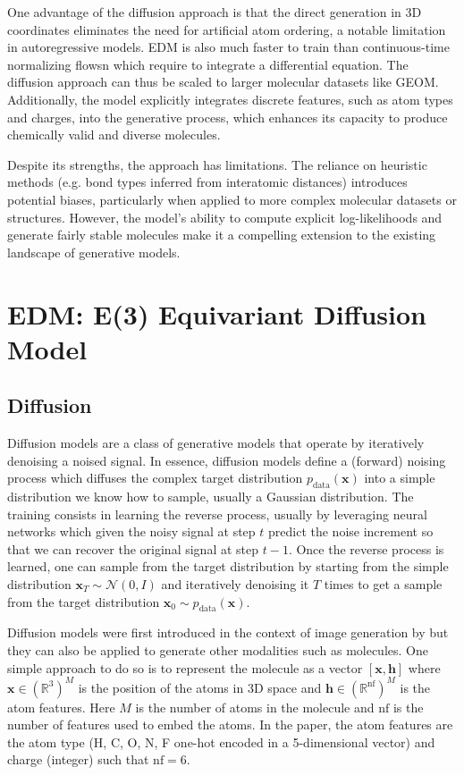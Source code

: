\documentclass[sigconf]{acmart}
\begin{document}
One advantage of the diffusion approach is that the direct generation in 3D coordinates eliminates the need for artificial atom ordering, a notable limitation in autoregressive models. EDM is also much faster to train than continuous-time normalizing flowsn which require to integrate a differential equation. The diffusion approach can thus be scaled to larger molecular datasets like GEOM. Additionally, the model explicitly integrates discrete features, such as atom types and charges, into the generative process, which enhances its capacity to produce chemically valid and diverse molecules.

Despite its strengths, the approach has limitations. The reliance on heuristic methods (e.g. bond types inferred from interatomic distances) introduces potential biases, particularly when applied to more complex molecular datasets or structures. However, the model's ability to compute explicit log-likelihoods and generate fairly stable molecules make it a compelling extension to the existing landscape of generative models.


\section{EDM: E(3) Equivariant Diffusion Model} %
\subsection{Diffusion}
Diffusion models are a class of generative models that operate by iteratively denoising a noised signal.
In essence, diffusion models define a (forward) noising process which diffuses the complex target distribution $p_\text{data}(\mathbf{x})$ into a simple distribution we know how to sample, usually a Gaussian distribution.
The training consists in learning the reverse process, usually by leveraging neural networks which given the noisy signal at step $t$ predict the noise increment so that we can recover the original signal at step $t-1$.
Once the reverse process is learned, one can sample from the target distribution by starting from the simple distribution $\mathbf{x}_T \sim \mathcal{N}(0, I)$ and iteratively denoising it $T$ times to get a sample from the target distribution $\mathbf{x}_0 \sim p_\text{data}(\mathbf{x})$.

Diffusion models were first introduced in the context of image generation by \cite{ddpm} but they can also be applied to generate other modalities such as molecules.
One simple approach to do so is to represent the molecule as a vector $\left[ \mathbf{x}, \mathbf{h} \right]$ where $\mathbf{x} \in (\mathbb{R}^3)^M$ is the position of the atoms in 3D space and $\mathbf{h} \in (\mathbb{R}^\text{nf})^M$ is the atom features.
Here $M$ is the number of atoms in the molecule and $\text{nf}$ is the number of features used to embed the atoms.
In the paper, the atom features are the atom type (H, C, O, N, F one-hot encoded in a 5-dimensional vector) and charge (integer) such that $\text{nf} = 6$.
\end{document}
